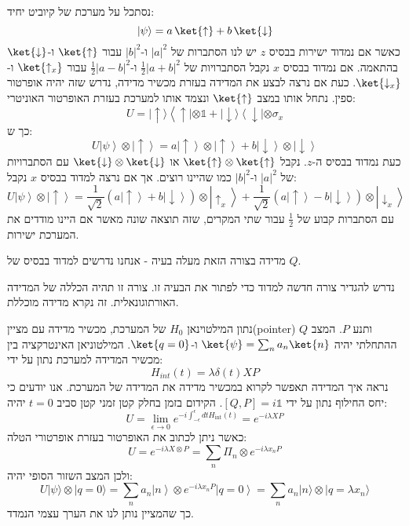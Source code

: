\documentclass{tstextbook}
\begin{document}
\begin{example}
נסתכל על מערכת של קיוביט יחיד:
$$|\psi\rangle=a\,\ket{\uparrow } +b\,\ket{\downarrow } $$
כאשר אם נמדוד ישירות בבסיס \(z\) יש לנו הסתברות של \(\lvert a \rvert^{2}\) ו-\(\lvert b \rvert^{2}\) עבור \(\ket{\uparrow}\) ו-\(\ket{\downarrow}\) בהתאמה. אם נמדוד בבסיס \(x\) נקבל הסתברויות של \(\frac{1}{2}\lvert a+b \rvert^{2}\) ו-\(\frac{1}{2}\lvert a-b \rvert^{2}\) עבור \(\ket{\uparrow_{x}}\) ו-\(\ket{\downarrow_{x}}\). כעת אם נרצה לבצע את המדידה בעזרת מכשיר מדידה, נדרש שזה יהיה אופרטור ספין. נתחל אותו במצב \(\ket{\uparrow}\) ונצמד אותו למערכת בעזרת האופרטור האוניטרי:
$$U=|\!\uparrow\rangle\left\langle\uparrow\!|\otimes\mathbb{1}+|\!\downarrow\rangle\left\langle\downarrow\!|\otimes\sigma_{x}\right.\right.$$
כך ש:
$$U\left|\psi\right\rangle\otimes\left|\uparrow\right\rangle=a\left|\uparrow\right\rangle\otimes\left|\uparrow\right\rangle+b\left|\downarrow\right\rangle\otimes\left|\downarrow\right\rangle$$
כעת נמדוד בבסיס ה-\(z\). נקבל \(\ket{\uparrow}\otimes \ket{\uparrow}\) או \(\ket{\downarrow}\otimes \ket{\downarrow}\) עם הסתברויות של \(\lvert a \rvert^{2}\) ו-\(\lvert b \rvert^{2}\) כמו שהיינו רוצים. אך אם נרצה למדוד בבסיס \(x\) נקבל:
$$U\left|\psi\right\rangle\otimes\left|\uparrow\right\rangle=\frac{1}{\sqrt{2}}\left(a\left|\uparrow\right\rangle+b\left|\downarrow\right\rangle\right)\otimes\left|\uparrow_{x}\right\rangle+\frac{1}{\sqrt{2}}\left(a\left|\uparrow\right\rangle-b\left|\downarrow\right\rangle\right)\otimes\left|\downarrow_{x}\right\rangle$$
עם הסתברות קבוע של \(\frac{1}{2}\) עבור שתי המקרים, שזה תוצאה שונה מאשר אם היינו מודדים את המערכת ישירות.

\end{example}
\begin{remark}
מדידה בצורה הזאת מעלה בעיה - אנחנו נדרשים למדוד בבסיס של \(Q\).

\end{remark}
\begin{remark}
נדרש להגדיר צורה חדשה למדוד כדי לפתור את הבעיה זו. צורה זו תהיה הכללה של המדידה האורתוגונאלית. זה נקרא מדידה מוכללת.

\end{remark}
\begin{example}
נתון המילטוינאן \(H_{0}\) של המערכת, מכשיר מדידה עם מציין(pointer) \(Q\) ותנע \(P\). המצב ההתחלתי יהיה \(\ket{\psi}=\sum_{n}a_{n}\ket{n}\) ו-\(\ket{q=0}\). המילטוניאן האינטרקציה בין מכשיר המדידה למערכת נתון על ידי:
$$H_{i n t}(t)=\lambda\delta(t)X P$$
נראה איך המדידה תאפשר לקרוא במכשיר מדידה את המדידה של המערכת.
אנו יודעים כי יחס החילוף נתון על ידי \([Q,P]=i\mathbb{1}\). הקידום בזמן בחלק קטן זמני קטן סביב \(t=0\) יהיה:
$$U=\operatorname*{lim}_{\epsilon\rightarrow0}e^{-i\int_{-\epsilon}^{\epsilon}d t H_{\mathrm{int}}(t)}=e^{-i\lambda X P}$$
כאשר ניתן לכתוב את האופרטור בעזרת אופרטורי הטלה:
$$U=e^{ -i\lambda X\otimes P }=\sum_{n}\Pi_{n}\otimes e^{-i\lambda x_{n}P}$$
ולכן המצב השזור הסופי יהיה:
$$U|\psi\rangle\otimes|q=0\rangle=\sum_{n}a_{n}\left|n\right\rangle\otimes e^{-i\lambda x_{n}P}\left|q=0\right\rangle=\sum_{n}a_{n}|n\rangle\otimes|q=\lambda x_{n}\rangle$$
כך שהמציין נותן לנו את הערך עצמי הנמדד.

\end{example}
\end{document}
